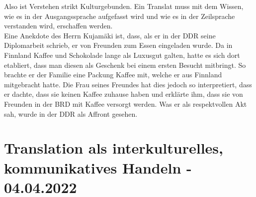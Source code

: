 \documentclass{article}
\begin{document}
	Also ist Verstehen strikt Kulturgebunden. Ein Translat muss mit dem Wissen, wie es in der Ausgangssprache aufgefasst wird und wie es in der Zeilsprache verstanden wird, erschaffen werden. \\
	Eine Anekdote des Herrn Kujamäki ist, dass, als er in der DDR seine Diplomarbeit schrieb, er von Freunden zum Essen eingeladen wurde. Da in Finnland Kaffee und Schokolade lange als Luxusgut galten, hatte es sich dort etabliert, dass man diesen als Geschenk bei einem ersten Besucht mitbringt. So brachte er der Familie eine Packung Kaffee mit, welche er aus Finnland mitgebracht hatte. Die Frau seines Freundes hat dies jedoch so interpretiert, dass er dachte, dass sie keinen Kaffee zuhause haben und erklärte ihm, dass sie von Freunden in der BRD mit Kaffee versorgt werden. Was er als respektvollen Akt sah, wurde in der DDR als Affront gesehen. \\

	\section{Translation als interkulturelles, kommunikatives Handeln - 04.04.2022}
\end{document}
